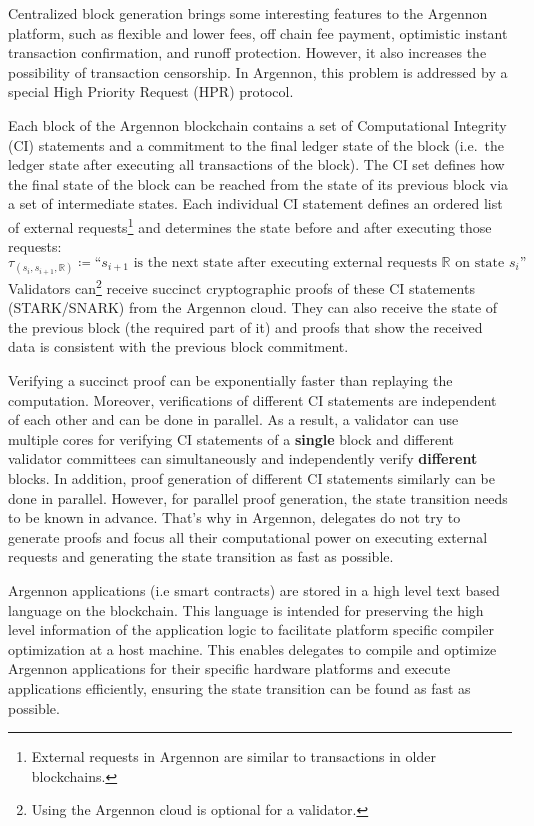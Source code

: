 Centralized block generation brings some interesting features to the Argennon platform, such as flexible and lower
fees, off chain fee payment, optimistic instant transaction confirmation, and runoff protection.
However, it also increases the possibility of transaction censorship. In Argennon, this problem is addressed by a
special High Priority Request (HPR) protocol.

Each block of the Argennon blockchain contains a set of Computational Integrity (CI) statements and a commitment to
the final ledger state of the block (i.e.\ the ledger state after executing all transactions of the block). The CI
set defines how the final state of the block can be reached from
the state of its previous block via a set of intermediate states.
Each individual CI statement defines an ordered list of external requests\footnote{External requests in Argennon are
similar to transactions in older blockchains.} and determines the state before and after executing those requests:
\[
    \tau_{(s_i,s_{i+1},\mathbb{R})} \coloneqq \text{``$s_{i+1}$ is the next state after executing external requests
        $\mathbb{R}$ on state $s_i$''}
\]
Validators can\footnote{Using the Argennon cloud is optional for a validator.} receive succinct cryptographic proofs
of these CI statements (STARK/SNARK) from the Argennon cloud. They can also receive the state of the previous
block (the required part of it) and proofs that show the received data is consistent with the previous block commitment.

Verifying a succinct proof can be exponentially faster than replaying the computation. Moreover, verifications of
different CI statements are independent of each other and can be done in parallel. As a result, a validator can use
multiple cores for verifying CI statements of a \textbf{single} block and different validator committees can
simultaneously and
independently verify \textbf{different} blocks.
In addition, proof generation of different CI statements similarly can be done in parallel. However, for parallel
proof generation, the state transition needs to be known in advance. That's why in Argennon, delegates do not try
to generate proofs and focus all their computational power on executing external requests and
generating the state transition as fast as possible.

Argennon applications (i.e smart contracts) are stored in a high level text based language on the blockchain. This
language is intended for preserving the
high level information of the application logic to facilitate platform specific compiler optimization at a host
machine. This enables delegates to compile and optimize Argennon applications for their specific hardware platforms
and execute applications efficiently, ensuring the state transition can be found as fast as possible.

